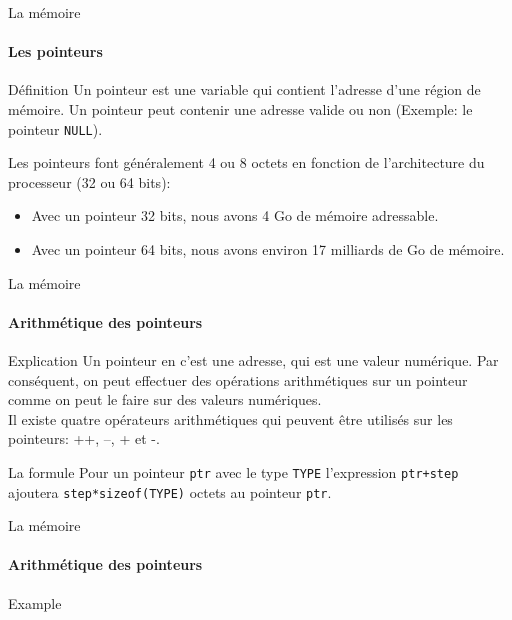 \documentclass{beamer}
\begin{document}
\begin{darkframes}
	\begin{frame}{La mémoire}
		\framesubtitle{Les pointeurs}
		\begin{block}{Définition}
			Un pointeur est une variable qui contient l'adresse d'une région de mémoire. Un pointeur peut contenir une adresse valide ou non (Exemple: le pointeur \texttt{NULL}). \\
		\end{block}
		Les pointeurs font généralement 4 ou 8 octets en fonction de l'architecture du processeur (32 ou 64 bits): 
		\begin{itemize}
			\item Avec un pointeur 32 bits, nous avons 4 Go de mémoire adressable.
			\item Avec un pointeur 64 bits, nous avons environ 17 milliards de Go de mémoire.
		\end{itemize}
	\end{frame}
	
	\begin{frame}{La mémoire}
		\framesubtitle{Arithmétique des pointeurs}
		\begin{block}{Explication}
			Un pointeur en c'est une adresse, qui est une valeur numérique. Par conséquent, on peut effectuer des opérations arithmétiques sur un pointeur comme on peut le faire sur des valeurs numériques.\\ 
			Il existe quatre opérateurs arithmétiques qui peuvent être utilisés sur les pointeurs: \alert{++}, \alert{--}, \alert{+} et \alert{-}.
		\end{block}
		\begin{block}{La formule}
			Pour un pointeur \texttt{ptr} avec le type \texttt{TYPE} l'expression \texttt{ptr+step} ajoutera \texttt{step*sizeof(TYPE)} octets au pointeur \texttt{ptr}.
		\end{block}
	\end{frame}
  	
  	\begin{frame}{La mémoire}
  		\framesubtitle{Arithmétique des pointeurs}
  		\begin{exampleblock}{Example}
  			\ptrArithExmp
  		\end{exampleblock}
  	

\end{frame}
\end{darkframes}
\end{document}
